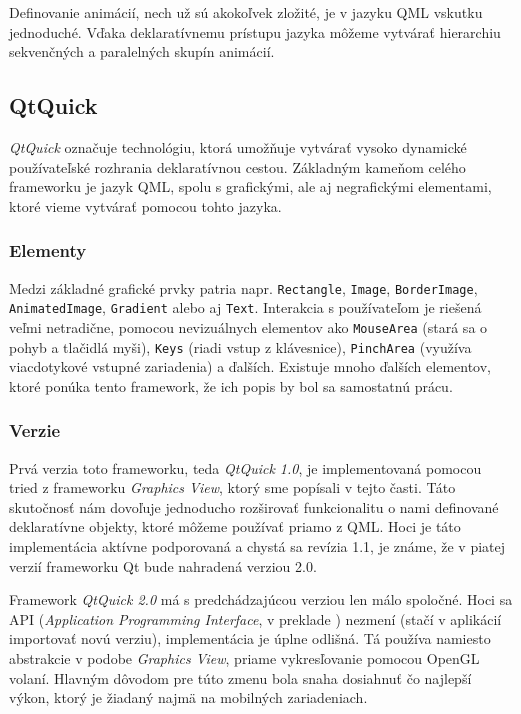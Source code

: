 

Definovanie animácií, nech už sú akokoľvek zložité, je v jazyku QML vskutku jednoduché. Vďaka deklaratívnemu prístupu jazyka môžeme vytvárať hierarchiu sekvenčných a paralelných skupín animácií.

\subsection{QtQuick}

\textit{QtQuick} označuje technológiu, ktorá umožňuje vytvárať vysoko dynamické používateľské rozhrania deklaratívnou cestou. Základným kameňom celého frameworku je jazyk QML, spolu s grafickými, ale aj negrafickými elementami, ktoré vieme vytvárať pomocou tohto jazyka.

\subsubsection{Elementy}

Medzi základné grafické prvky patria napr. \texttt{Rectangle}, \texttt{Image}, \texttt{BorderImage}, \texttt{Animated\-Image}, \texttt{Gradient} alebo aj \texttt{Text}. Interakcia s používateľom je riešená veľmi netradične, pomocou nevizuálnych elementov ako \texttt{MouseArea} (stará sa o pohyb a tlačidlá myši), \texttt{Keys} (riadi vstup z klávesnice), \texttt{PinchArea} (využíva viacdotykové vstupné zariadenia) a ďalších. Existuje mnoho ďalších elementov, ktoré ponúka tento framework, že ich popis by bol sa samostatnú prácu.

\subsubsection{Verzie}

Prvá verzia toto frameworku, teda \textit{QtQuick 1.0}, je implementovaná pomocou tried z frameworku \textit{Graphics View}, ktorý sme popísali v tejto časti. Táto skutočnosť nám dovoľuje jednoducho rozširovať funkcionalitu o nami definované deklaratívne objekty, ktoré môžeme používať priamo z QML. Hoci je táto implementácia aktívne podporovaná a chystá sa revízia 1.1, je známe, že v piatej verzií frameworku Qt bude nahradená verziou 2.0.

Framework \textit{QtQuick 2.0} má s predchádzajúcou verziou len málo spoločné. Hoci sa API (\textit{Application Programming Interface}, v preklade ) nezmení (stačí v aplikácií importovať novú verziu), implementácia je úplne odlišná. Tá používa namiesto abstrakcie v podobe \textit{Graphics View}, priame vykresľovanie pomocou OpenGL volaní. Hlavným dôvodom pre túto zmenu bola snaha dosiahnuť čo najlepší výkon, ktorý je žiadaný najmä na mobilných zariadeniach.

